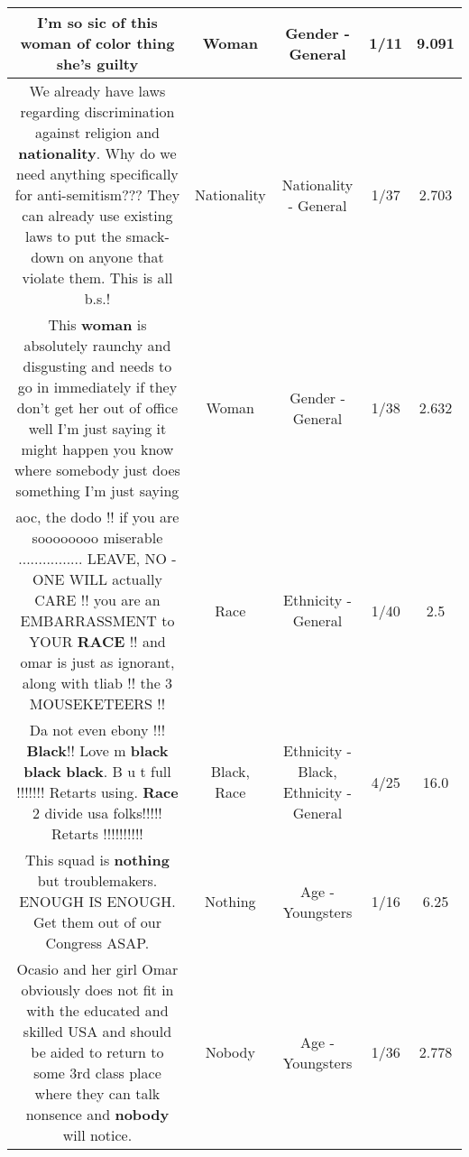 \documentclass[11pt]{article}
\newlength\mylength
\begin{document}
\begin{center}
\begin{longtable}{|C{.65\mylength}|C{.30\mylength}|C{.12\mylength}|C{.12\mylength}|C{.12\mylength}|}
  \small I'm so sic of this \textbf{woman} of color thing she's guilty\normalsize   & Woman & Gender - General & 1/11 & 9.091 \\  \hline
  \small We already have laws regarding discrimination against religion and \textbf{nationality}.  Why do we need anything specifically for anti-semitism???  They can already use existing laws to put the smack-down on anyone that violate them.  This is all b.s.!\normalsize   & Nationality & Nationality - General & 1/37 & 2.703 \\  \hline
  \small This \textbf{woman} is absolutely raunchy and disgusting and needs to go in immediately if they don't get her out of office well I'm just saying it might happen you know where somebody just does something I'm just saying\normalsize   & Woman & Gender - General & 1/38 & 2.632 \\  \hline
  \small aoc, the dodo !! if you are soooooooo  miserable ................ LEAVE, NO - ONE   WILL  actually  CARE !!  you are an  EMBARRASSMENT to  YOUR  \textbf{RACE} !!  and omar  is  just as ignorant, along  with  tliab !!  the  3   MOUSEKETEERS !!\normalsize   & Race & Ethnicity - General & 1/40 & 2.5 \\  \hline
  \small Da not even ebony !!! \textbf{Black}!! Love m \textbf{black} \textbf{black} \textbf{black}.  B u t full !!!!!!! Retarts using. \textbf{Race} 2 divide usa folks!!!!! Retarts !!!!!!!!!!\normalsize   & Black, Race & Ethnicity - Black, Ethnicity - General & 4/25 & 16.0 \\  \hline
  \small This squad is \textbf{nothing} but troublemakers. ENOUGH IS ENOUGH. Get them out of our Congress ASAP.\normalsize   & Nothing & Age - Youngsters & 1/16 & 6.25 \\  \hline
  \small Ocasio and her girl Omar obviously does not fit in with the educated and skilled USA and should be aided to return to some 3rd class place where they can talk nonsence and \textbf{nobody} will notice.\normalsize   & Nobody & Age - Youngsters & 1/36 & 2.778 \\  \hline

\end{longtable}
\end{center}
\end{document}
